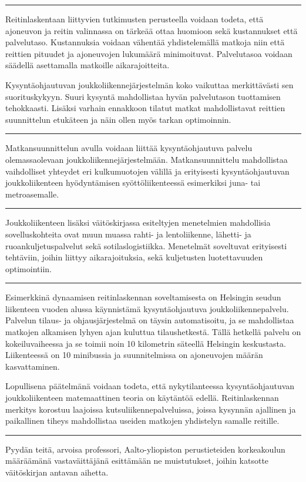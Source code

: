 \documentclass[a4paper,12pt]{article}
\newcommand*\sepline{%
  \begin{center}
    \rule[1ex]{.5\textwidth}{.5pt}
  \end{center}}
\begin{document}
\sepline

Reitinlaskentaan liittyvien tutkimusten perusteella voidaan todeta, että ajoneuvon ja reitin valinnassa on tärkeää 
ottaa huomioon sekä kustannukset että palvelutaso. Kustannuksia voidaan vähentää yhdistelemällä matkoja
niin että reittien pituudet ja ajoneuvojen lukumäärä minimoituvat. Palvelutasoa voidaan säädellä asettamalla 
matkoille aikarajoitteita.

Kysyntäohjautuvan joukkoliikennejärjestelmän koko vaikuttaa
merkittävästi sen suorituskykyyn. Suuri kysyntä mahdollistaa hyvän palvelutason tuottamisen tehokkaasti.
Lisäksi varhain ennakkoon tilatut matkat mahdollistavat reittien suunnittelun etukäteen ja näin ollen myös tarkan optimoinnin.

\sepline

Matkansuunnittelun avulla voidaan liittää kysyntäohjautuva palvelu olemassaolevaan joukkoliikennejärjestelmään.
Matkansuunnittelu mahdollistaa vaihdolliset yhteydet eri kulkumuotojen välillä ja erityisesti kysyntäohjautuvan 
joukkoliikenteen hyödyntämisen syöttöliikenteessä esimerkiksi juna- tai metroasemalle.

\sepline

Joukkoliikenteen lisäksi väitöskirjassa esiteltyjen menetelmien mahdollisia sovelluskohteita ovat muun muassa
rahti- ja lentoliikenne, lähetti- ja ruoankuljetuspalvelut sekä sotilaslogistiikka. Menetelmät 
soveltuvat erityisesti tehtäviin, joihin liittyy aikarajoituksia, sekä kuljetusten luotettavuuden optimointiin.

\sepline

Esimerkkinä dynaamisen reitinlaskennan soveltamisesta on
Helsingin seudun liikenteen vuoden alussa käynnistämä kysyntäohjautuva joukkoliikennepalvelu.
Palvelun tilaus- ja ohjausjärjestelmä on täysin automatisoitu, ja se mahdollistaa matkojen alkamisen lyhyen ajan
kuluttua tilaushetkestä. Tällä hetkellä palvelu on kokeiluvaiheessa ja se toimii noin 10 kilometrin 
säteellä Helsingin keskustasta. Liikenteessä on 10 minibussia ja suunnitelmissa on ajoneuvojen määrän kasvattaminen.

Lopullisena päätelmänä voidaan todeta, että nykytilanteessa kysyntäohjautuvan joukkoliikenteen matemaattinen teoria on käytäntöä edellä.
Reitinlaskennan merkitys korostuu laajoissa kutsuliikennepalveluissa, joissa kysynnän
ajallinen ja paikallinen tiheys mahdollistaa useiden matkojen yhdistelyn samalle reitille. 

\sepline

Pyydän teitä, arvoisa professori, Aalto-yliopiston perustieteiden korkeakoulun määräämänä vastaväittäjänä esittämään ne 
muistutukset, joihin katsotte väitöskirjan antavan aihetta.
\end{document}
